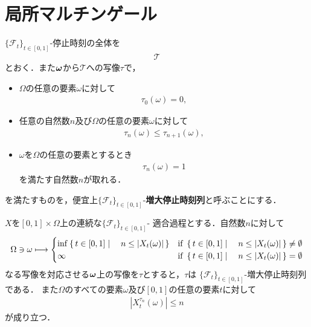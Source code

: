 \section{局所マルチンゲール}
	
	$\{\mathscr{F}_{t}\}_{t \in [0,1]}$-停止時刻の全体を
	\begin{align}
		\mathscr{T}
	\end{align}
	とおく．また${\boldsymbol \omega}$から$\mathscr{T}$への写像$\tau$で，
	\begin{itemize}
		\item $\Omega$の任意の要素$\omega$に対して
			\begin{align}
				\tau_{0}(\omega) = 0,
			\end{align}
			
		\item 任意の自然数$n$及び$\Omega$の任意の要素$\omega$に対して
			\begin{align}
				\tau_{n}(\omega) \leq \tau_{n+1}(\omega),
			\end{align}
			
		\item $\omega$を$\Omega$の任意の要素とするとき
			\begin{align}
				\tau_{n}(\omega) = 1
			\end{align}
			を満たす自然数$n$が取れる．
	\end{itemize}
	
	を満たすものを，便宜上$\{\mathscr{F}_{t}\}_{t \in [0,1]}$-{\bf 増大停止時刻列}と呼ぶことにする．
	
	\begin{screen}
		\begin{thm}[連続適合過程で作る増大停止時刻列]
		\label{thm:increasing_stopping_times_made_from_continuous_adapted_process}
			$X$を$[0,1] \times \Omega$上の連続な$\{\mathscr{F}_{t}\}_{t \in [0,1]}$-
			適合過程とする．自然数$n$に対して
			\begin{align}
				\Omega \ni \omega \longmapsto 
				\begin{cases}
					\operatorname*{inf}_{} \left\{\, t \in [0,1] \mid \quad n \leq |X_t(\omega)|\, \right\} & \mbox{if } \left\{\, t \in [0,1] \mid \quad n \leq |X_t(\omega)|\, \right\} \neq \emptyset \\
					\infty & \mbox{if } \left\{\, t \in [0,1] \mid \quad n \leq |X_t(\omega)|\, \right\} = \emptyset
				\end{cases}
			\end{align}
			なる写像を対応させる${\boldsymbol \omega}$上の写像を$\tau$とすると，$\tau$は
			$\{\mathscr{F}_t\}_{t \in [0,1]}$-増大停止時刻列である．
			また$\Omega$のすべての要素$\omega$及び$[0,1]$の任意の要素$t$に対して
			\begin{align}
				\left|X^{\tau_n}_t(\omega)\right| \leq n
			\end{align}
			が成り立つ．
		\end{thm}
	\end{screen}
	
